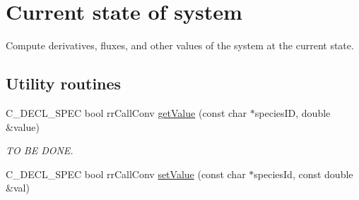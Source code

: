 \hypertarget{group__state}{
\section{\-Current state of system}
\label{group__state}
}


\-Compute derivatives, fluxes, and other values of the system at the current state.  


\subsection*{\-Utility routines}
\begin{DoxyCompactItemize}
\item 
\hypertarget{group__utility_ga8c67bc930b33926bccb3c9f810dc2825}{
\-C\-\_\-\-D\-E\-C\-L\-\_\-\-S\-P\-E\-C bool rr\-Call\-Conv \hyperlink{group__utility_ga8c67bc930b33926bccb3c9f810dc2825}{get\-Value} (const char $\ast$species\-I\-D, double \&value)}
\label{group__utility_ga8c67bc930b33926bccb3c9f810dc2825}

\begin{DoxyCompactList}\small\item\em \-T\-O \-B\-E \-D\-O\-N\-E. \end{DoxyCompactList}\item 
\hypertarget{group__utility_ga8663bcca2b00ef20c13841ca9fc9f56c}{
\-C\-\_\-\-D\-E\-C\-L\-\_\-\-S\-P\-E\-C bool rr\-Call\-Conv \hyperlink{group__utility_ga8663bcca2b00ef20c13841ca9fc9f56c}{set\-Value} (const char $\ast$species\-Id, const double \&val)}
\label{group__utility_ga8663bcca2b00ef20c13841ca9fc9f56c}


\end{DoxyCompactItemize}
